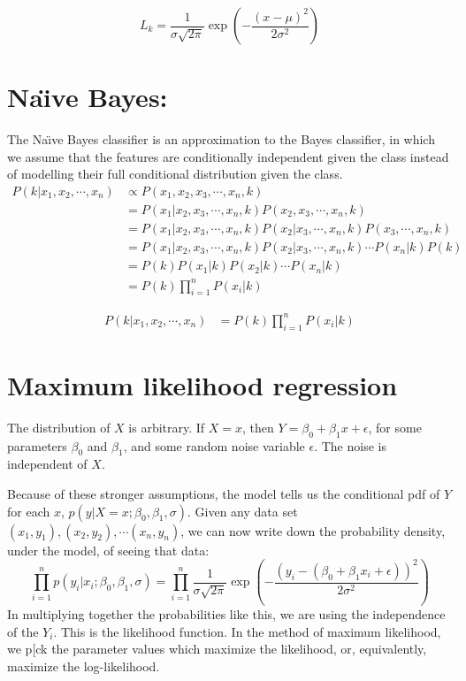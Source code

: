 \documentclass{article}
\begin{document}
\[
L_k = \frac{1}{\sigma\sqrt{2\pi}} \exp \left( -\frac{(x-\mu)^2}{2\sigma^2} \right)
\]

\section{Na\"{\i}ve Bayes:}
The Na\"{\i}ve Bayes classifier is an approximation to the Bayes classifier, in which we assume that the features are conditionally independent given the class instead of modelling their full conditional distribution given the class.
\begin{align*} 
P(k|x_1,x_2,\cdots,x_n) &\propto  P(x_1,x_2,x_3,\cdots,x_n,k) \\ 
&=  P(x_1|x_2,x_3,\cdots,x_n,k)P(x_2,x_3,\cdots,x_n,k) \\ 
&= P(x_1|x_2,x_3,\cdots,x_n,k)P(x_2|x_3,\cdots,x_n,k)P(x_3,\cdots,x_n,k) \\
&=  P(x_1|x_2,x_3,\cdots,x_n,k)P(x_2|x_3,\cdots,x_n,k) \cdots P(x_n|k)P(k) \\ 
&=  P(k)P(x_1|k)P(x_2|k) \cdots P(x_n|k) \\
&=  P(k)\prod_{i=1}^{n} P(x_i|k)
\end{align*}

\begin{align*} 
P(k|x_1,x_2,\cdots,x_n) &= P(k)\prod_{i=1}^{n} P(x_i|k)
\end{align*}

\section{Maximum likelihood regression}
The distribution of $X$ is arbitrary. If $X=x$, then $Y=\beta_0+\beta_1 x+\epsilon$, for some parameters $\beta_0$ and $\beta_1$, and some random noise variable $\epsilon$. The noise is independent of $X$.

Because of these stronger assumptions, the model tells us the conditional pdf of $Y$ for each $x$, $p(y|X=x;\beta_0,\beta_1,\sigma)$. Given any data set $(x_1,y_1),(x_2,y_2),\cdots (x_n,y_n)$, we can now write down the probability density, under the model, of seeing that data:
\[
\prod_{i=1}^n p(y_i|x_i;\beta_0,\beta_1,\sigma) = \prod_{i=1}^n \frac{1}{\sigma\sqrt{2\pi}}  \exp \left( -\frac{(y_i-(\beta_0+\beta_1 x_i+\epsilon))^2}{2\sigma^2} \right)
\]
In multiplying together the probabilities like this, we are using the independence of the $Y_i$. This is the likelihood function. In the method of maximum likelihood, we p[ck the parameter values which  maximize  the  likelihood,  or,  equivalently,  maximize  the  log-likelihood.
\end{document}
